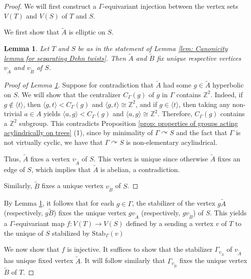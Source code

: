 \documentclass{amsart}
\newcommand{\Z}{\mathbb{Z}}
\theoremstyle{plain}
\newtheorem{lemma}[thm]{Lemma}
\theoremstyle{definition}
\theoremstyle{remark}
\begin{document}
\begin{proof}
    We will first construct a $\Gamma$-equivariant injection between the vertex sets $V(T)$ and $V(S)$ of $T$ and $S$. 

    We first show that $\tilde{A}$ is elliptic on $S$. 
    
    \begin{lemma}
        \label{lem: tilde A elliptic on S separating}
        Let $T$ and $S$ be as in the statement of Lemma \ref{lem: Canonicity lemma for separating Dehn twists}. Then $\tilde{A}$ and $\tilde{B}$ fix unique respective vertices $v_{\tilde{A}}$ and $v_{\tilde{B}}$ of $S$. 
    \end{lemma}

    \begin{proof}[Proof of Lemma \ref{lem: tilde A elliptic on S separating}]
        Suppose for contradiction that $\tilde{A}$ had some $g \in \tilde{A}$ hyperbolic on $S$. We will show that the centralizer $C_{\Gamma}(g)$ of $g$ in $\Gamma$ contains $\Z^2$. Indeed, if $g \notin \langle t \rangle$, then $\langle g, t \rangle < C_{\Gamma}(g)$ and $\langle g, t \rangle \cong \Z^2$, and if $g \in \langle t \rangle$, then taking any non-trivial $a \in A$ yields $\langle a, g \rangle < C_{\Gamma}(g)$ and $\langle a, g \rangle \cong \Z^2$. Therefore, $C_{\Gamma}(g)$ contains a $\Z^2$ subgroup. This contradicts Proposition \ref{prop: properties of groups acting acylindrically on trees} (1), since by minimality of $\Gamma \curvearrowright S$ and the fact that $\Gamma$ is not virtually cyclic, we have that $\Gamma \curvearrowright S$ is non-elementary acylindrical. 

    Thus, $\tilde{A}$ fixes a vertex $v_{\tilde{A}}$ of $S$. This vertex is unique since otherwise $\tilde{A}$ fixes an edge of $S$, which implies that $\tilde{A}$ is abelian, a contradiction.

    Similarly, $\tilde{B}$ fixes a unique vertex $v_{\tilde{B}}$ of $S$. 
    \end{proof}

By Lemma \ref{lem: tilde A elliptic on S separating}, it follows that for each $g \in \Gamma$, the stabilizer of the vertex $g \tilde{A}$ (respectively, $g \tilde{B}$) fixes the unique vertex $g v_{\tilde{A}}$ (respectively, $g v_{\tilde{B}}$) of $S$. This yields a $\Gamma$-equivariant map $f: V(T) \to V(S)$ defined by a sending a vertex $v$ of $T$ to the unique of $S$ stabilized by $\mathrm{Stab}_{\Gamma}(v)$

    We now show that $f$ is injective. It suffices to show that the stabilizer $\Gamma_{v_{\tilde{A}}}$ of $v_{\tilde{A}}$ has unique fixed vertex $\tilde{A}$. It will follow similarly that $\Gamma_{v_{\tilde{B}}}$ fixes the unique vertex $\tilde{B}$ of $T$. 
    

\end{proof}
\end{document}
